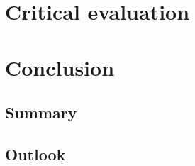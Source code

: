 \section{Critical evaluation}
\label{sec:evaluation}

\section{Conclusion}
\label{sec:conclusion}
% 

\subsection*{Summary}

\subsection*{Outlook}
